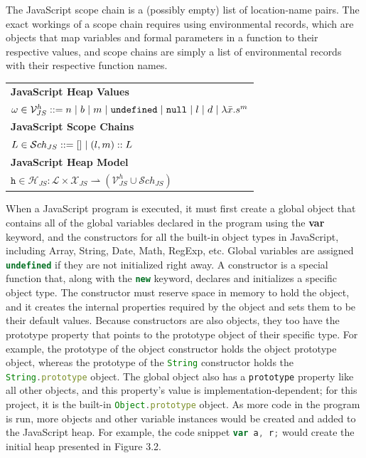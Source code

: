 \documentclass[a4paper,11pt,twoside]{report}
\def\jsinline{\lstinline[language=JavaScript, basicstyle=\small]}%\end{lstlisting}
\begin{document}
The JavaScript scope chain is a (possibly empty) list of location-name pairs. The exact workings of a scope chain requires using environmental records, which are objects that map variables and formal parameters in a function to their respective values, and scope chains are simply a list of environmental records with their respective function names.

\begin{center}
\begin{tabular}{p{10cm}} 
\textbf{JavaScript Heap Values} \\
$\omega \in \mathcal{V}_{JS}^{h} ::= n \hspace{3pt}|\hspace{3pt} b \hspace{3pt}|\hspace{3pt} m \hspace{3pt}|\hspace{3pt} \mathtt{undefined} \hspace{3pt}|\hspace{3pt} \mathtt{null} \hspace{3pt}|\hspace{3pt} l \hspace{3pt}|\hspace{3pt} d \hspace{3pt}|\hspace{3pt} \lambda \bar{x}.s^m $  \\[0.3cm]

\textbf{JavaScript Scope Chains} \\
$L \in \mathcal{S}ch_{JS} ::= [ ] \hspace{3pt}|\hspace{3pt} (l, m) :: L $  \\[0.3cm]

\textbf{JavaScript Heap Model} \\
$\texttt{h} \in \mathcal{H}_{JS} : \mathcal{L} \times \mathcal{X}_{JS} \rightharpoonup (\mathcal{V}_{JS}^h \cup \mathcal{S}ch_{JS})$  \\ 
\end{tabular}
\end{center}

When a JavaScript program is executed, it must first create a global object that contains all of the global variables declared in the program using the \textbf{var} keyword, and the constructors for all the built-in object types in JavaScript, including Array, String, Date, Math, RegExp, etc. Global variables are assigned \jsinline|undefined| if they are not initialized right away. A constructor is a special function that, along with the \jsinline|new| keyword, declares and initializes a specific object type. The constructor must reserve space in memory to hold the object, and it creates the internal properties required by the object and sets them to be their default values. Because constructors are also objects, they too have the prototype property that points to the prototype object of their specific type. For example, the prototype of the object constructor holds the object prototype object, whereas the prototype of the \jsinline|String| constructor holds the \jsinline|String.prototype| object. The global object also has a \jsinline|prototype| property like all other objects, and this property's value is implementation-dependent; for this project, it is the built-in \jsinline|Object.prototype| object. As more code in the program is run, more objects and other variable instances would be created and added to the JavaScript heap. For example, the code snippet \jsinline|var a, r;| would create the initial heap presented in Figure 3.2.
\end{document}
